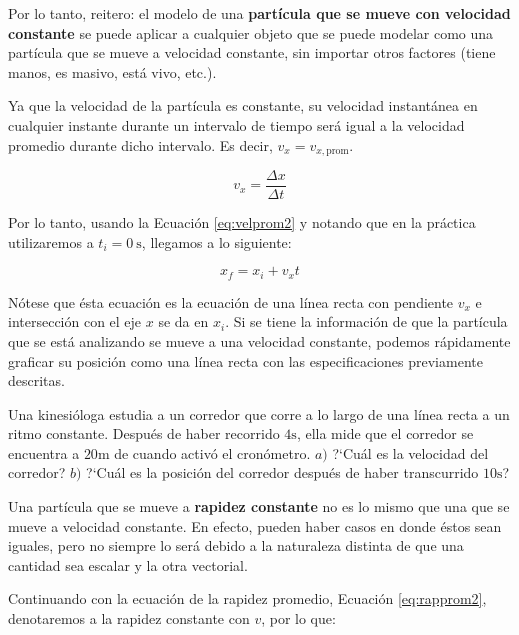 Por lo tanto, reitero: el modelo de una \textbf{part\'icula que se mueve con velocidad constante} se puede aplicar a cualquier objeto que se puede modelar como una part\'icula que se mueve a velocidad constante, sin importar otros factores (tiene manos, es masivo, est\'a vivo, etc.).

Ya que la velocidad de la part\'icula es constante, su velocidad instant\'anea en cualquier instante durante un intervalo de tiempo ser\'a igual a la velocidad promedio durante dicho intervalo. Es decir, $v_{x}=v_{x,\text{prom}}$. 

\begin{equation*}
    v_{x}=\frac{\Delta x}{\Delta t}
\end{equation*}

Por lo tanto, usando la Ecuaci\'on \ref{eq:velprom2} y notando que en la pr\'actica utilizaremos a $t_{i}=\SI{0}{\second}$, llegamos a lo siguiente:

\begin{equation}\label{eq:velconst2}
    x_{f}=x_{i}+v_{x}t
\end{equation}

N\'otese que \'esta ecuaci\'on es la ecuaci\'on de una l\'inea recta con pendiente $v_{x}$ e intersecci\'on con el eje $x$ se da en $x_{i}$. Si se tiene la informaci\'on de que la part\'icula que se est\'a analizando se mueve a una velocidad constante, podemos r\'apidamente graficar su posici\'on como una l\'inea recta con las especificaciones previamente descritas.

\begin{ejercicio}
Una kinesi\'ologa estudia a un corredor que corre a lo largo de una l\'inea recta a un ritmo constante. Despu\'es de haber recorrido $4\si{\second}$, ella mide que el corredor se encuentra a $20\si{\meter}$ de cuando activ\'o el cron\'ometro. $a)$ ?`Cu\'al es la velocidad del corredor? $b)$ ?`Cu\'al es la posici\'on del corredor despu\'es de haber transcurrido $10\si{\second}$?
\end{ejercicio}

Una part\'icula que se mueve a \textbf{rapidez constante} no es lo mismo que una que se mueve a velocidad constante. En efecto, pueden haber casos en donde \'estos sean iguales, pero no siempre lo ser\'a debido a la naturaleza distinta de que una cantidad sea escalar y la otra vectorial. 

Continuando con la ecuaci\'on de la rapidez promedio, Ecuaci\'on \ref{eq:rapprom2}, denotaremos a la rapidez constante con $v$, por lo que:

